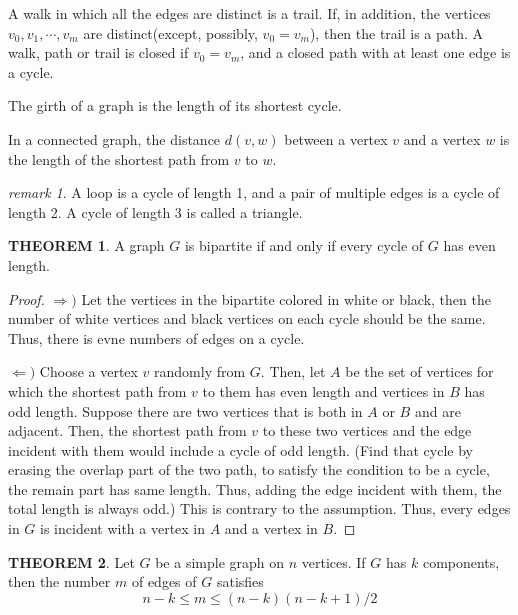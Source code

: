\documentclass[a4paper,11pt]{article}%
\theoremstyle{remark}
\newtheorem*{remark}{remark}
\theoremstyle{definition}
\newtheorem{theorem}{THEOREM}[section]
\theoremstyle{definition}
\theoremstyle{definition}
\theoremstyle{definition}
\theoremstyle{plain}
\theoremstyle{definition}
\begin{document}
A walk in which all the edges are distinct is a trail. If, in addition, the 
vertices $v_0,v_1,\cdots,v_m$ are distinct(except, possibly, $v_0=v_m$), 
then the trail is a path. A walk, path or trail is closed if $v_0=v_m$,
and a closed path with at least one edge is a cycle.

The girth of a graph is the length of its shortest cycle.

In a connected graph, the distance $d(v,w)$ between a vertex $v$ and a vertex $w$
is the length of the shortest path from $v$ to $w.$
\begin{remark}
    A loop is a cycle of length 1, and a pair of multiple edges is a cycle of 
    length 2. A cycle of length 3 is called a triangle.
\end{remark}
\begin{theorem}
    A graph $G$ is bipartite if and only if every cycle of $G$ has even length.
\end{theorem}
\begin{proof}
    $\Rightarrow)$ Let the vertices in the bipartite colored in 
    white or black, then the number of white vertices and black vertices 
    on each cycle should be the same. Thus, there is evne numbers of edges 
    on a cycle.

    $\Leftarrow)$ Choose a vertex $v$ randomly from $G$.
    Then, let $A$ be the set of vertices for which the shortest path 
    from $v$ to them has even length and vertices in $B$ has odd length.
    Suppose there are two vertices that is both in $A$ or $B$ and 
    are adjacent. Then, the shortest path from $v$ to these two vertices and
    the edge incident with them would include a cycle of odd length. 
    (Find that cycle by erasing the overlap part of the two path, 
    to satisfy the condition to be a cycle, the remain part 
    has same length. Thus, adding the edge incident with them, the total
    length is always odd.) This is contrary to the assumption.
    Thus, every edges in $G$ is incident with a vertex in $A$ and a 
    vertex in $B$.
\end{proof}
\begin{theorem}
    Let $G$ be a simple graph on $n$ vertices. If $G$ has $k$ components,
    then the number $m$ of edges of $G$ satisfies
    \[n-k\leq m\leq (n-k)(n-k+1)/2\]
\end{theorem}
\end{document}
